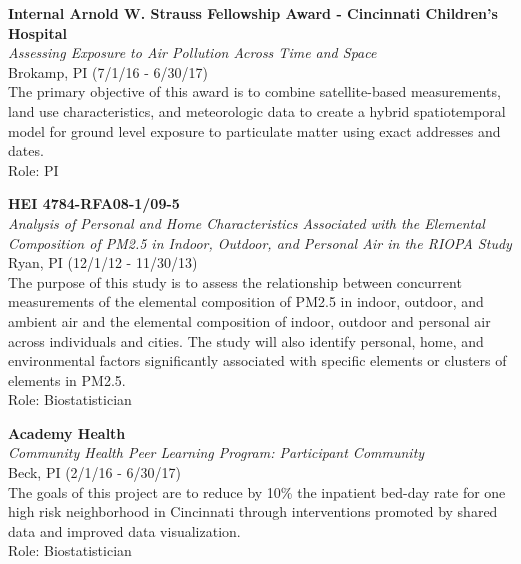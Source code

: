 \documentclass{nihbiosketch}
\begin{document}
\bigskip

\textbf{Internal Arnold W. Strauss Fellowship Award - Cincinnati
	Children's Hospital}\\
\emph{Assessing Exposure to Air Pollution Across Time and Space}\\
Brokamp, PI (7/1/16 - 6/30/17)\\
The primary objective of this award is to combine satellite-based
measurements, land use characteristics, and meteorologic data to create
a hybrid spatiotemporal model for ground level exposure to particulate
matter using exact addresses and dates.\\
Role: PI

\bigskip

\textbf{HEI 4784-RFA08-1/09-5}\\
\emph{Analysis of Personal and Home Characteristics Associated with the
	Elemental Composition of PM2.5 in Indoor, Outdoor, and Personal Air in
	the RIOPA Study}\\
Ryan, PI (12/1/12 - 11/30/13)\\
The purpose of this study is to assess the relationship between
concurrent measurements of the elemental composition of PM2.5 in indoor,
outdoor, and ambient air and the elemental composition of indoor,
outdoor and personal air across individuals and cities. The study will
also identify personal, home, and environmental factors significantly
associated with specific elements or clusters of elements in PM2.5.\\
Role: Biostatistician

\bigskip

\textbf{Academy Health}\\
\emph{Community Health Peer Learning Program: Participant Community}\\
Beck, PI (2/1/16 - 6/30/17)\\
The goals of this project are to reduce by 10\% the inpatient bed-day
rate for one high risk neighborhood in Cincinnati through interventions
promoted by shared data and improved data visualization.\\
Role: Biostatistician
\end{document}
